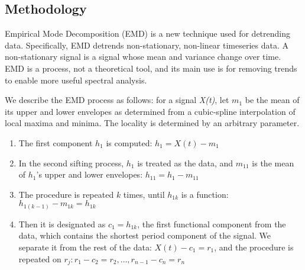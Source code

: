 


\subsection{Methodology}\label{method}

Empirical Mode Decomposition (EMD) \cite{huang:emd1998} is a new technique used for detrending data.
Specifically, EMD detrends non-stationary, non-linear timeseries data.  
A non-stationary signal is a signal whose mean and
variance change over time.  EMD is a process, not a theoretical tool, and its main use is for removing trends 
to enable more useful spectral analysis.

We describe the EMD process as follows:  for a signal \emph{X(t)}, let $m_1$ be the mean of its upper and
lower envelopes as determined from a cubic-spline interpolation of local maxima and minima. The locality 
is determined by an arbitrary parameter.

\begin{enumerate}
\item The first component $h_1$ is computed: $h_1=X(t)-m_1$
\item In the second sifting process, $h_1$ is treated as the data, and $m_{11}$ is the mean of $h_1$'s upper and lower envelopes: $h_{11}=h_1-m_{11}$
\item The procedure is repeated $k$ times, until $h_{1k}$ is a function: $h_{1(k-1)}-m_{1k}=h_{1k}$
\item Then it is designated as $c_1=h_{1k}$, the first functional component from the data, which contains the shortest period component of the signal. We separate it from the rest of the data: $X(t)-c_1 = r_1$, and the procedure is
repeated on $r_j: r_1-c_2 = r_2,\dots,r_{n-1} - c_n = r_n$
\end{enumerate}

